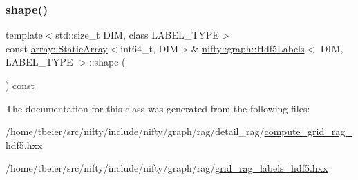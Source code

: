 \subsubsection{\texorpdfstring{shape()}{shape()}}
{\footnotesize\ttfamily template$<$std\+::size\+\_\+t D\+IM, class L\+A\+B\+E\+L\+\_\+\+T\+Y\+PE$>$ \\
const \hyperlink{namespacenifty_1_1array_a683f151f19c851754e0c6d55ed16a0c2}{array\+::\+Static\+Array}$<$int64\+\_\+t, D\+IM$>$\& \hyperlink{classnifty_1_1graph_1_1Hdf5Labels}{nifty\+::graph\+::\+Hdf5\+Labels}$<$ D\+IM, L\+A\+B\+E\+L\+\_\+\+T\+Y\+PE $>$\+::shape (\begin{DoxyParamCaption}{ }\end{DoxyParamCaption}) const\hspace{0.3cm}{\ttfamily [inline]}}



The documentation for this class was generated from the following files\+:\begin{DoxyCompactItemize}
\item 
/home/tbeier/src/nifty/include/nifty/graph/rag/detail\+\_\+rag/\hyperlink{compute__grid__rag__hdf5_8hxx}{compute\+\_\+grid\+\_\+rag\+\_\+hdf5.\+hxx}\item 
/home/tbeier/src/nifty/include/nifty/graph/rag/\hyperlink{grid__rag__labels__hdf5_8hxx}{grid\+\_\+rag\+\_\+labels\+\_\+hdf5.\+hxx}\end{DoxyCompactItemize}
